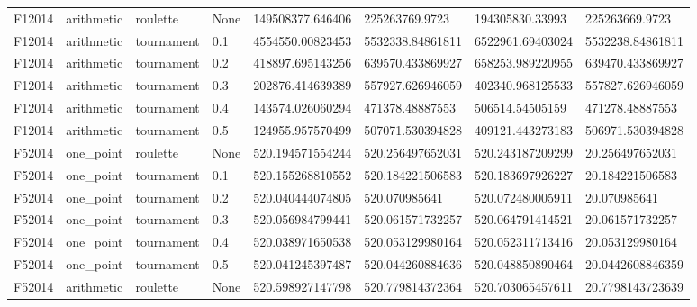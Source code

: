 \begin{table}[!ht]
{\begin{tabular}{llllllll}
            F12014                                     & arithmetic & roulette   & None & 149508377.646406 & 225263769.9723   & 194305830.33993  & 225263669.9723   \\
            F12014                                     & arithmetic & tournament & 0.1  & 4554550.00823453 & 5532338.84861811 & 6522961.69403024 & 5532238.84861811 \\
            F12014                                     & arithmetic & tournament & 0.2  & 418897.695143256 & 639570.433869927 & 658253.989220955 & 639470.433869927 \\
            F12014                                     & arithmetic & tournament & 0.3  & 202876.414639389 & 557927.626946059 & 402340.968125533 & 557827.626946059 \\
            F12014                                     & arithmetic & tournament & 0.4  & 143574.026060294 & 471378.48887553  & 506514.54505159  & 471278.48887553  \\
            F12014                                     & arithmetic & tournament & 0.5  & 124955.957570499 & 507071.530394828 & 409121.443273183 & 506971.530394828 \\
            F52014                                     & one\_point & roulette   & None & 520.194571554244 & 520.256497652031 & 520.243187209299 & 20.256497652031  \\
            F52014                                     & one\_point & tournament & 0.1  & 520.155268810552 & 520.184221506583 & 520.183697926227 & 20.184221506583  \\
            F52014                                     & one\_point & tournament & 0.2  & 520.040444074805 & 520.070985641    & 520.072480005911 & 20.070985641     \\
            F52014                                     & one\_point & tournament & 0.3  & 520.056984799441 & 520.061571732257 & 520.064791414521 & 20.061571732257  \\
            F52014                                     & one\_point & tournament & 0.4  & 520.038971650538 & 520.053129980164 & 520.052311713416 & 20.053129980164  \\
            F52014                                     & one\_point & tournament & 0.5  & 520.041245397487 & 520.044260884636 & 520.048850890464 & 20.0442608846359 \\
            F52014                                     & arithmetic & roulette   & None & 520.598927147798 & 520.779814372364 & 520.703065457611 & 20.7798143723639 \\

\end{tabular}}
\end{table}
